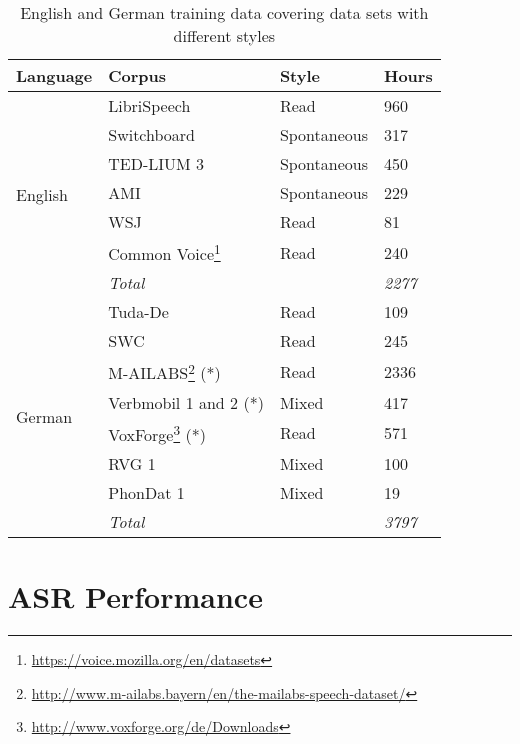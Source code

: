 \documentclass[12pt,a4paper]{article}
\begin{document}
\begin{savenotes}
\begin{table}[H]
 \centering
 \caption{English and German training data covering data sets with different styles}
  \footnotesize
  \begin{tabular}{|l|l|l|l|}
    \hline
    \textbf{Language} & \textbf{Corpus} & \textbf{Style} & \textbf{Hours} \\
    \hline
    \multirow[t]{7}{*}{English} & LibriSpeech \cite{panayotov2015librispeech} & Read & 960 \\
    \cline{2-4}
    & Switchboard \cite{godfrey1992switchboard} & Spontaneous & 317 \\
    \cline{2-4}
    & TED-LIUM 3 \cite{hernandez2018ted} & Spontaneous & 450 \\
    \cline{2-4}
    & AMI \cite{carletta2007unleashing} & Spontaneous & 229 \\
    \cline{2-4}
    & WSJ \cite{paul1992design} & Read & 81 \\
    \cline{2-4}
    & Common Voice\footnote{\url{https://voice.mozilla.org/en/datasets}} & Read & 240 \\
    \cline{2-4}
    & \textit{Total} & & \textit{2277} \\
    \hline
    \multirow[t]{8}{*}{German} & Tuda-De \cite{radeck2015open} & Read & 109 \\
    \cline{2-4}
    & SWC \cite{kohn2016mining} & Read & 245 \\
    \cline{2-4}
    & M-AILABS\footnote{\url{http://www.m-ailabs.bayern/en/the-mailabs-speech-dataset/}} (*) & Read & 2336 \\
    \cline{2-4}
    & Verbmobil 1 and 2 \cite{wahlster2013verbmobil} (*) & Mixed & 417 \\
    \cline{2-4}
    & VoxForge\footnote{\url{http://www.voxforge.org/de/Downloads}} (*) & Read & 571 \\
    \cline{2-4}
    & RVG 1 \cite{burger1998rvg} & Mixed & 100 \\
    \cline{2-4}
    & PhonDat 1 \cite{hess1995phondat} & Mixed & 19 \\
    \cline{2-4}
    & \textit{Total} & & \textit{3797} \\
    \hline
  \end{tabular}
  \label{tab:data}
\end{table}
\end{savenotes}

\section{ASR Performance}
\end{document}
